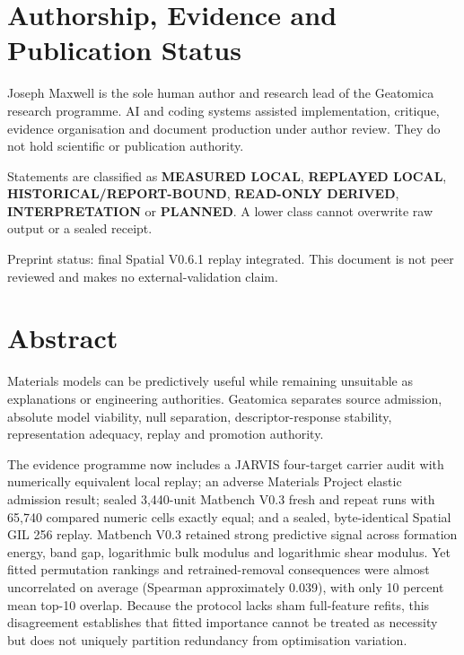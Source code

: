 \documentclass[11pt,a4paper,oneside]{report}
\begin{document}






\clearpage
\chapter*{Authorship, Evidence and Publication Status}

Joseph Maxwell is the sole human author and research lead of the Geatomica research
programme. AI and coding systems assisted implementation, critique, evidence organisation and document production under author review. They do not hold scientific or publication authority.

Statements are classified as \textbf{MEASURED LOCAL}, \textbf{REPLAYED LOCAL},
\textbf{HISTORICAL/\allowbreak REPORT-BOUND}, \textbf{READ-ONLY DERIVED},
\textbf{INTERPRETATION} or \textbf{PLANNED}. A lower class cannot overwrite raw
output or a sealed receipt.

Preprint status: final Spatial V0.6.1 replay integrated. This document is not peer reviewed and makes no external-validation claim.

\clearpage
\chapter*{Abstract}

Materials models can be predictively useful while remaining unsuitable as
explanations or engineering authorities. Geatomica separates source admission,
absolute model viability, null separation, descriptor-response stability,
representation adequacy, replay and promotion authority.

The evidence programme now includes a JARVIS four-target carrier audit with
numerically equivalent local replay; an adverse Materials Project elastic
admission result; sealed 3,440-unit Matbench V0.3 fresh and repeat runs with
65,740 compared numeric cells exactly equal;
and a sealed, byte-identical Spatial GIL 256 replay. Matbench V0.3 retained strong
predictive signal across formation energy, band gap, logarithmic bulk modulus and
logarithmic shear modulus. Yet fitted permutation rankings and retrained-removal
consequences were almost uncorrelated on average (Spearman approximately 0.039),
with only 10 percent mean top-10 overlap. Because the protocol lacks sham
full-feature refits, this disagreement establishes that fitted importance cannot
be treated as necessity but does not uniquely partition redundancy from
optimisation variation.
\end{document}
